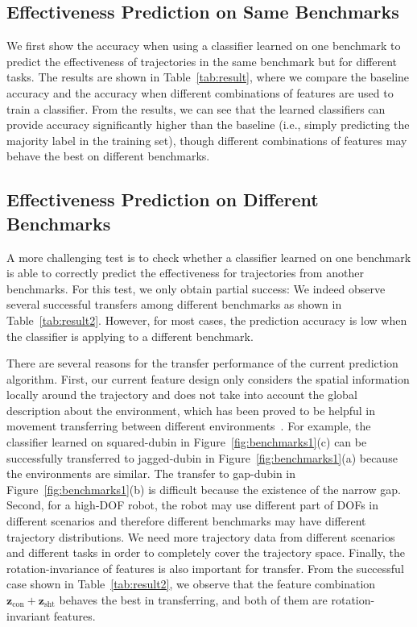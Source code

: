 \documentclass[letterpaper, 10 pt, conference]{ieeeconf}  %
\newcommand{\fcon}{\mbox{$\mathbf z_{\text{con}}$}}
\newcommand{\fsht}{\mbox{$\mathbf z_{\text{sht}}$}}
\begin{document}
\subsection{Effectiveness Prediction on Same Benchmarks}
We first show the accuracy when using a classifier learned on one benchmark to predict the effectiveness of trajectories in the same benchmark but for different tasks. The results are shown in Table~\ref{tab:result}, where we compare the baseline accuracy and the accuracy when different combinations of features are used to train a classifier. From the results, we can see that the learned classifiers can provide accuracy significantly higher than the baseline (i.e., simply predicting the majority label in the training set), though different combinations of features may behave the best on different benchmarks.



\subsection{Effectiveness Prediction on Different Benchmarks}
A more challenging test is to check whether a classifier learned on one benchmark is able to correctly predict the effectiveness for trajectories from another benchmarks. For this test, we only obtain partial success: We indeed observe several successful transfers among different benchmarks as shown in Table~\ref{tab:result2}. However, for most cases, the prediction accuracy is low when the classifier is applying to a different benchmark.

There are several reasons for the transfer performance of the current prediction algorithm. First, our current feature design only considers the spatial information locally around the trajectory and does not take into account the global description about the environment, which has been proved to be helpful in movement transferring between different environments~\cite{Jetchev:2013:FMP}. For example, the classifier learned on squared-dubin in Figure~\ref{fig:benchmarks1}(c) can be successfully transferred to jagged-dubin in Figure~\ref{fig:benchmarks1}(a) because the environments are similar. The transfer to gap-dubin in Figure~\ref{fig:benchmarks1}(b) is difficult because the existence of the narrow gap. Second, for a high-DOF robot, the robot may use different part of DOFs in different scenarios and therefore different benchmarks may have different trajectory distributions. We need more trajectory data from different scenarios and different tasks in order to completely cover the trajectory space. Finally, the rotation-invariance of features is also important for transfer. From the successful case shown in Table~\ref{tab:result2}, we observe that the feature combination $\fcon+\fsht$ behaves the best in transferring, and both of them are rotation-invariant features. 
\end{document}
